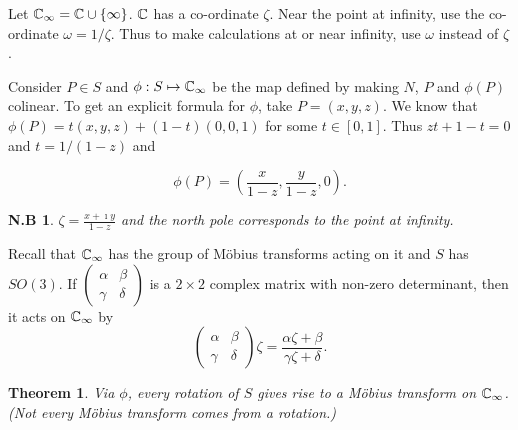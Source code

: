 \documentclass{notes}
\theoremstyle{plain}
\newtheorem{theorem}[proposition]{Theorem}
\newtheorem*{notes}{N.B}
\newcommand{\Cinf}{\C_\infty}
\begin{document}
Let $\Cinf = \C \cup \{ \infty \}$.  $\mathbb{C}$ has a co-ordinate $\zeta$.  Near the
point at infinity, use the co-ordinate $\omega = 1/\zeta$.  Thus to make
calculations at or near infinity, use $\omega$ instead of $\zeta$.

Consider $P \in S$ and $\phi : S \mapsto \Cinf$ be the map defined by
making $N$, $P$ and $\phi(P)$ colinear.  To get an explicit formula for $\phi$,
take $P = (x,y,z)$.  We know that $\phi(P) = t(x,y,z) + (1-t)(0,0,1)$ for some
$t \in [0,1]$.  Thus $zt + 1 - t = 0$ and $t = 1/(1-z)$ and

\[
\phi(P) = \left(\frac{x}{1-z}, \frac{y}{1-z}, 0 \right).
\]

\begin{notes}
$\zeta = \frac{x + \imath y}{1-z}$ and the north pole corresponds
to the point at infinity.
\end{notes}

Recall that $\Cinf$ has the group of M\"{o}bius transforms acting on it and
$S$ has $SO(3)$.  If $\left( \begin{matrix}
\alpha & \beta \\
\gamma & \delta \end{matrix} \right)$ is a $2 \times 2$ complex matrix with
non-zero determinant, then it acts on $\Cinf$ by
\[
\left( \begin{matrix}
\alpha & \beta \\
\gamma & \delta \end{matrix} \right) \zeta = 
\frac{\alpha \zeta + \beta}{\gamma \zeta + \delta}.
\]


\begin{theorem}
Via $\phi$, every rotation of $S$ gives rise to a M\"{o}bius transform on
$\Cinf$. (Not every M\"{o}bius transform comes from a rotation.)
\end{theorem}
\end{document}
